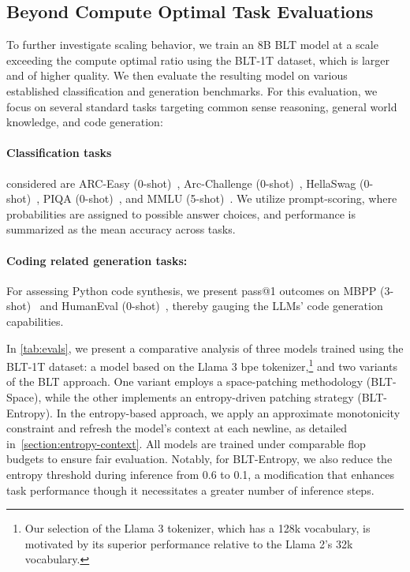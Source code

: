 \subsection{Beyond Compute Optimal Task Evaluations}
\label{section:evals}
To further investigate scaling behavior, we train an 8B {\textsc BLT} model at a scale exceeding the compute optimal ratio using the {\textsc BLT}-1T dataset, which is larger and of higher quality. We then evaluate the resulting model on various established classification and generation benchmarks. For this evaluation, we focus on several standard tasks targeting common sense reasoning, general world knowledge, and code generation:
\paragraph{Classification tasks} considered are ARC-Easy (0-shot)~\citep{Eval_ARC}, Arc-Challenge (0-shot)~\citep{Eval_ARC}, HellaSwag (0-shot)~\citep{Eval_hellaswag}, PIQA (0-shot)~\citep{Eval_piqa}, and MMLU (5-shot)~\citep{hendrycks2020measuring}. We utilize prompt-scoring, where probabilities are assigned to possible answer choices, and performance is summarized as the mean accuracy across tasks.
\paragraph{Coding related generation tasks:}  For assessing Python code synthesis, we present pass@1 outcomes on MBPP (3-shot)~\citep{Eval_MBPP} and HumanEval (0-shot)~\citep{Eval_HumanEval}, thereby gauging the LLMs’ code generation capabilities.

In \autoref{tab:evals}, we present a comparative analysis of three models trained using the {\textsc BLT}-1T dataset: a model based on the Llama 3 bpe tokenizer,\footnote{Our selection of the Llama 3 tokenizer, which has a 128k vocabulary, is motivated by its superior performance relative to the Llama 2’s 32k vocabulary.} and two variants of the {\textsc BLT} approach. One variant employs a space-patching methodology ({\textsc BLT}-Space), while the other implements an entropy-driven patching strategy ({\textsc BLT}-Entropy). In the entropy-based approach, we apply an approximate monotonicity constraint and refresh the model’s context at each newline, as detailed in~\autoref{section:entropy-context}. All models are trained under comparable flop budgets to ensure fair evaluation. Notably, for {\textsc BLT}-Entropy, we also reduce the entropy threshold during inference from 0.6 to 0.1, a modification that enhances task performance though it necessitates a greater number of inference steps.

